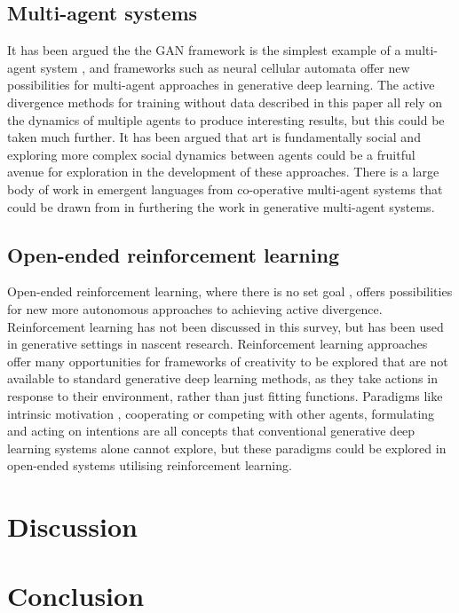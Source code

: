 \subsection{Multi-agent systems}

It has been argued the the GAN framework is the simplest example of a multi-agent system \citep{arcas2019social}, and frameworks such as neural cellular automata \citep{mordvintsev2020growing} offer new possibilities for multi-agent approaches in generative deep learning. The active divergence methods for training without data described in this paper all rely on the dynamics of multiple agents to produce interesting results, but this could be taken much further. It has been argued that art is fundamentally social \citep{hertzmann2021social} and exploring more complex social dynamics between agents \citep{saunders2019multi} could be a fruitful avenue for exploration in the development of these approaches. There is a large body of work in emergent languages from co-operative multi-agent systems \citep{lazaridou2016multi} that could be drawn from in furthering the work in generative multi-agent systems. 

\subsection{Open-ended reinforcement learning}

Open-ended reinforcement learning, where there is no set goal \citep{wang2020enhanced}, offers possibilities for new more autonomous approaches to achieving active divergence. Reinforcement learning has not been discussed in this survey, but has been used in generative settings \citep{luo2020reinforcement} in nascent research. Reinforcement learning approaches offer many opportunities for frameworks of creativity to be explored that are not available to standard generative deep learning methods, as they take actions in response to their environment, rather than just fitting functions. Paradigms like intrinsic motivation \citep{shaker2016intrinsically}, cooperating or competing with other agents, formulating and acting on intentions are all concepts that conventional generative deep learning systems alone cannot explore, but these paradigms could be explored in open-ended systems utilising reinforcement learning.


\section{Discussion}

\section{Conclusion}